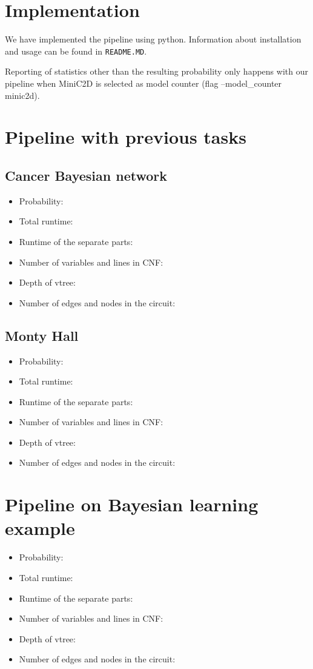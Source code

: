 \section{Implementation}
We have implemented the pipeline using python. Information about installation and usage can be found in \texttt{README.MD}.

Reporting of statistics other than the resulting probability only happens with our pipeline when MiniC2D is selected as model counter (flag --model\_counter minic2d).

\section{Pipeline with previous tasks}
\subsection{Cancer Bayesian network}
\begin{itemize}
    \item Probability:
    \item Total runtime:
    \item Runtime of the separate parts:
    \item Number of variables and lines in CNF:
    \item Depth of vtree:
    \item Number of edges and nodes in the circuit:
\end{itemize}
\subsection{Monty Hall}
\begin{itemize}
    \item Probability:
    \item Total runtime:
    \item Runtime of the separate parts:
    \item Number of variables and lines in CNF:
    \item Depth of vtree:
    \item Number of edges and nodes in the circuit:
\end{itemize}

\section{Pipeline on Bayesian learning example}
\begin{itemize}
    \item Probability:
    \item Total runtime:
    \item Runtime of the separate parts:
    \item Number of variables and lines in CNF:
    \item Depth of vtree:
    \item Number of edges and nodes in the circuit:
\end{itemize}

